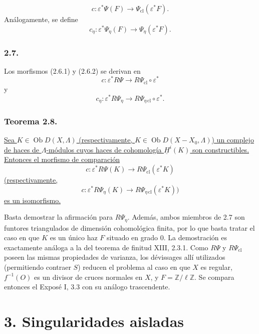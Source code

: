 \pageoriginale

\begin{equation}\tag{2.6.1}
c:\varepsilon^*\Psi(F)
\longrightarrow\Psi_{\mathrm{cl}}(\varepsilon^*F).
\end{equation}
Análogamente, se define
\begin{equation}\tag{2.6.2}
c_\eta:\varepsilon^*\Psi_\eta(F)
\longrightarrow\Psi_\eta(\varepsilon^*F).
\end{equation}

\subsubsection*{2.7.}
Los morfismos (2.6.1) y (2.6.2) se derivan en
\[
c:\varepsilon^*R\Psi
\longrightarrow R\Psi_{\mathrm{cl}}\circ\varepsilon^*
\]
y
\[
c_\eta:\varepsilon^*R\Psi_\eta
\longrightarrow R\Psi_{\eta\,\mathrm{cl}}\circ\varepsilon^*.
\]

\subsubsection*{Teorema 2.8.}
\underline{Sea $K\in\operatorname{Ob}D(X,\Lambda)$ (respectivamente,
$K\in\operatorname{Ob}D(X-X_0,\Lambda)$) un complejo de haces de
$\Lambda$-módulos cuyos haces de cohomología $\underline H^i(K)$ son
constructibles. Entonces el morfismo de comparación}
\[
c:\varepsilon^*R\Psi(K)
\longrightarrow R\Psi_{\mathrm{cl}}(\varepsilon^*K)
\]
\underline{(respectivamente,}
\[
c:\varepsilon^*R\Psi_\eta(K)
\longrightarrow R\Psi_{\eta\,\mathrm{cl}}(\varepsilon^*K))
\]
\underline{es un isomorfismo.}

Basta demostrar la afirmación para $R\Psi_\eta$. Además, ambos miembros de
2.7 son funtores triangulados de dimensión cohomológica finita, por lo que
basta tratar el caso en que $K$ es un único haz $F$ situado en grado $0$. La
demostración es exactamente análoga a la del teorema de finitud XIII, 2.3.1.
Como $R\Psi$ y $R\Psi_{\mathrm{cl}}$ poseen las mismas propiedades de
varianza, los dévissages allí utilizados (permitiendo contraer $S$) reducen
el problema al caso en que $X$ es regular, $f^{-1}(O)$ es un divisor de
cruces normales en $X$, y $F=\mathbb Z/\ell\mathbb Z$. Se compara entonces
el Exposé I, 3.3 con su análogo trascendente.

\pageoriginale

\section*{3. Singularidades aisladas}

